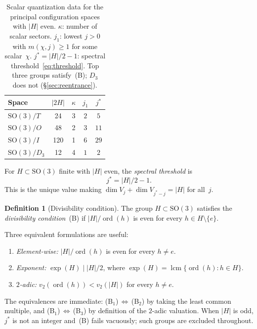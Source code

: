 \documentclass[12pt]{article}
\theoremstyle{definition}
\newtheorem{definition}[theorem]{Definition}
\theoremstyle{remark}
\newcommand{\SO}{\mathrm{SO}}
\DeclareMathOperator{\ord}{ord}
\DeclareMathOperator{\lcm}{lcm}
\begin{document}
\begin{table}[ht]
\centering
\begin{tabular}{@{}lcccc@{}}
  \toprule
  Space & $|2H|$ & $\kappa$ & $j_1$
        & $j^*$ \\
  \midrule
  $\SO(3)/T$   &   24 & 3 & $2$
    & $5$   \\
  $\SO(3)/O$   &   48 & 2 & $3$
    & $11$  \\
  $\SO(3)/I$   &  120 & 1 & $6$
    & $29$ \\
  \midrule
  $\SO(3)/D_3$ &   12 & 4 & $1$
    & $2$   \\
  \bottomrule
\end{tabular}
\caption{Scalar quantization data for the principal
  configuration spaces with $|H|$ even.
  $\kappa$: number of scalar sectors.
  $j_1$: lowest $j > 0$ with $m(\chi, j) \geq 1$
  for some scalar~$\chi$.
  $j^* = |H|/2 - 1$: spectral threshold~\eqref{eq:threshold}.
  Top three groups satisfy~(B); $D_3$ does not
  (\S\ref{sec:reentrance}).}
\label{tab:spectral}
\end{table}

For $H \subset \SO(3)$ finite with $|H|$ even, the
\emph{spectral threshold} is
\begin{equation}
  \label{eq:threshold}
  j^* = |H|/2 - 1.
\end{equation}
This is the unique value making $\dim V_j + \dim V_{j^*-j} = |H|$
for all~$j$.

\begin{definition}[Divisibility condition]
  \label{def:divisibility}
  The group $H \subset \SO(3)$ satisfies the
  \emph{divisibility condition}~(B) if
  $|H|/\ord(h)$ is even for every
  $h \in H \setminus \{e\}$.
\end{definition}

\noindent
Three equivalent formulations are useful:
\begin{enumerate}
  \item[\textup{(B$_1$)}] \emph{Element-wise:}
    $|H|/\ord(h)$ is even for every $h \neq e$.
  \item[\textup{(B$_2$)}] \emph{Exponent:}
    $\exp(H) \mid |H|/2$, where
    $\exp(H) = \lcm\{\ord(h) : h \in H\}$.
  \item[\textup{(B$_3$)}] \emph{$2$-adic:}
    $v_2(\ord(h)) < v_2(|H|)$ for every $h \neq e$.
\end{enumerate}
The equivalences are immediate:
(B$_1$)$\,\Leftrightarrow\,$(B$_2$) by taking the least common
multiple, and (B$_1$)$\,\Leftrightarrow\,$(B$_3$) by definition
of the $2$-adic valuation.
When $|H|$ is odd, $j^*$ is not an integer and~(B) fails
vacuously; such groups are excluded throughout.
\end{document}

